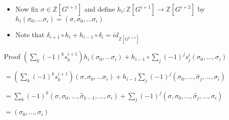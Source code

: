 \documentclass[10pt,xcolor=table,dvipsnames]{beamer}
\begin{document}
\begin{frame}
\begin{itemize}
\item  Now fix $\sigma \in \mathbb{Z}\left[ G^{i+1}\right] $ and define $h_{i}:%
\mathbb{Z}\left[ G^{i+1}\right] \longrightarrow \mathbb{Z}\left[ G^{i+2}%
\right] $ by $h_{i}\left( \sigma _{0},...\sigma _{i}\right) =\left( \sigma
,\sigma _{0},...\sigma _{i}\right) $
\item Note that $\delta _{i+1}\circ h_{i}+h_{i-1}\circ \delta _{i}=id_{\mathbb{Z}\left[
G^{i+1}\right] }$
\end{itemize}
\begin{block}{Proof}
$\left( \sum\limits_{k}\left( -1\right) ^{k}s_{k}^{i+1}\right) h_{i}\left(
\sigma _{0},...\sigma _{i}\right) +h_{i-1}\circ \sum\limits_{j}\left(
-1\right) ^{j}s_{j}^{i}\left( \sigma _{0},...,\sigma _{i}\right) $

$=\left( \sum\limits_{k}\left( -1\right) ^{k}s_{k}^{i+1}\right) \left(
\sigma ,\sigma _{0},...\sigma _{i}\right) +h_{i-1}\sum\limits_{j}\left(
-1\right) ^{j}\left( \sigma _{0},...,\widehat{\sigma }_{j},...,\sigma
_{i}\right) $

$=\sum\limits_{k}\left( -1\right) ^{k}\left( \sigma ,\sigma _{0},...,%
\widehat{\sigma }_{k-1},...,\sigma _{i}\right) +\sum\limits_{j}\left(
-1\right) ^{j}\left( \sigma ,\sigma _{0},...,\widehat{\sigma }%
_{j},...,\sigma _{i}\right) $

\textcolor{stupid}{$=\left( \sigma _{0},...,\sigma _{i}\right) $}

        \end{block}
\end{frame}
\end{document}
